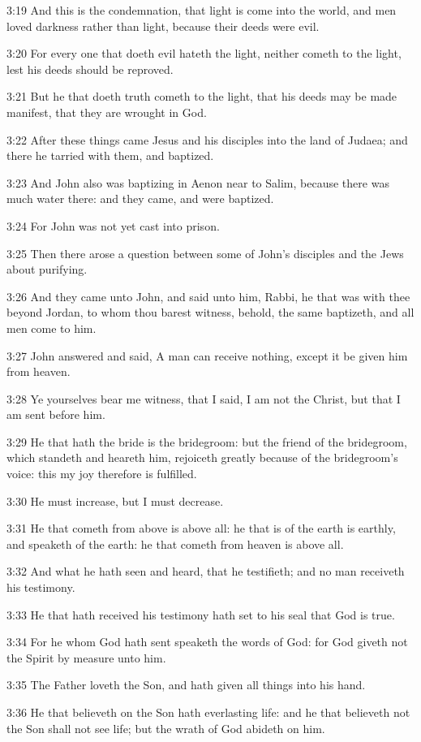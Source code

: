 3:19 And this is the condemnation, that light is come into the world, and men loved darkness rather than light, because their deeds were evil.

3:20 For every one that doeth evil hateth the light, neither cometh to the light, lest his deeds should be reproved.

3:21 But he that doeth truth cometh to the light, that his deeds may be made manifest, that they are wrought in God.

3:22 After these things came Jesus and his disciples into the land of Judaea; and there he tarried with them, and baptized.

3:23 And John also was baptizing in Aenon near to Salim, because there was much water there: and they came, and were baptized.

3:24 For John was not yet cast into prison.

3:25 Then there arose a question between some of John's disciples and the Jews about purifying.

3:26 And they came unto John, and said unto him, Rabbi, he that was with thee beyond Jordan, to whom thou barest witness, behold, the same baptizeth, and all men come to him.

3:27 John answered and said, A man can receive nothing, except it be given him from heaven.

3:28 Ye yourselves bear me witness, that I said, I am not the Christ, but that I am sent before him.

3:29 He that hath the bride is the bridegroom: but the friend of the bridegroom, which standeth and heareth him, rejoiceth greatly because of the bridegroom's voice: this my joy therefore is fulfilled.

3:30 He must increase, but I must decrease.

3:31 He that cometh from above is above all: he that is of the earth is earthly, and speaketh of the earth: he that cometh from heaven is above all.

3:32 And what he hath seen and heard, that he testifieth; and no man receiveth his testimony.

3:33 He that hath received his testimony hath set to his seal that God is true.

3:34 For he whom God hath sent speaketh the words of God: for God giveth not the Spirit by measure unto him.

3:35 The Father loveth the Son, and hath given all things into his hand.

3:36 He that believeth on the Son hath everlasting life: and he that believeth not the Son shall not see life; but the wrath of God abideth on him.


